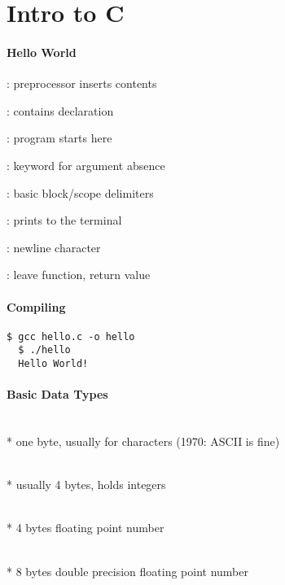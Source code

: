 \section{Intro to C}

\paragraph{Hello World}

\begin{items}
  \item {}: preprocessor inserts  contents
  \item {}: contains  declaration
  \item {}: program starts here
  \item {}: keyword for argument absence
  \item \code{\{  \}}: basic block/scope delimiters
  \item {}: prints to the terminal
  \item \code{\\n}: newline character
  \item {}: leave function, return value
\end{items}

\paragraph{Compiling}
\begin{lstlisting}[style=custombash]
  $ gcc hello.c -o hello
  $ ./hello
  Hello World!
\end{lstlisting}

\paragraph{Basic Data Types}
\begin{items}
  \item {} \\*
    one byte, usually for characters (1970: ASCII is fine)
  \item {} \\*
    usually 4 bytes, holds integers
  \item {} \\*
    4 bytes floating point number
  \item {} \\*
    8 bytes double precision floating point number
\end{items}

